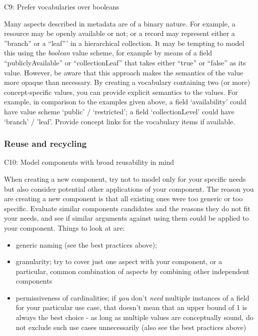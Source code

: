 C9: Prefer vocabularies over booleans

 

Many aspects described in metadata are of a binary nature. For example, a resource may be openly available or not; or a record may represent either a ''branch'' or a ``leaf''' in a hierarchical collection. It may be tempting to model this using the \emph{boolean} value scheme, for example by means of a field ``publiclyAvailable'' or ``collectionLeaf'' that takes either ``true'' or ``false'' as its value. However, be aware
that this approach makes the semantics of the value more opaque than necessary. By creating a vocabulary containing two (or more) concept-specific values, you can provide explicit semantics to the values. For example, in comparison to the examples given above, a field `availability' could have value scheme `public' / `restricted'; a field `collectionLevel' could have `branch' / 'leaf'. Provide concept links
for the vocabulary items if available.

\subsubsection{Reuse and recycling} \label{reuse-and-recycling}

C10: Model components with broad reusability in mind


When creating a new component, try not to model only for your specific needs but also consider potential other applications of your component. The reason you are creating a new component is that all existing ones were too generic or too specific. Evaluate similar components candidates and the reasons they do not fit your needs, and see if similar arguments against using them could be applied to your component. Things to look at
are:

\begin{itemize}
\tightlist
\item
  generic naming (see the  best practices above);
\item
  granularity; try to cover just one aspect with your component, or a particular, common combination of aspects by combining other independent components
\item
  permissiveness of cardinalities; if \emph{you} don't \emph{need} multiple instances of a field for your particular use case, that doesn't mean that an upper bound of 1 is always the best choice - as long as multiple values are conceptually sound, do not exclude such use cases unnecessarily (also see the  best practices above)
\end{itemize}

